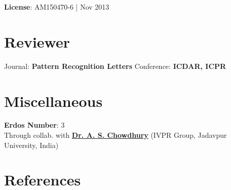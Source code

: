 \documentclass[letterpaper]{tap-resume}
\begin{document}
\begin{minipage}[t]{0.3333\textwidth}
\textbf{License}: AM150470-6 | Nov 2013

\sectionspace 

\section{Reviewer}

Journal: \textbf{Pattern Recognition Letters}
Conference: \textbf{ICDAR, ICPR}

\sectionspace 



\section{Miscellaneous}

\textbf{Erdos Number}: 3 \\
Through collab. with \textbf{\href{https://sites.google.com/site/anandachowdhury/}{Dr. A. S. Chowdhury}}
(IVPR Group, Jadavpur University, India)
\\


\sectionspace 

\section{References}




\sectionspace

\end{minipage} 
\hfill
%
%
\end{document}
